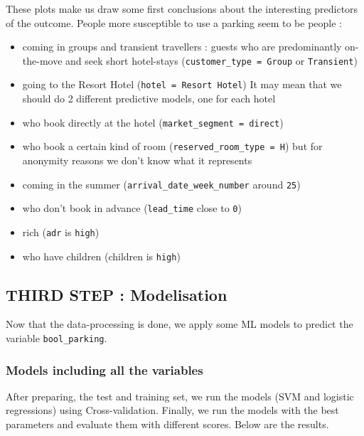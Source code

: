 \documentclass[10pt,a4paper]{article}
\providecommand{\tightlist}{%
  \setlength{\parskip}{0pt}
  }
\theoremstyle{break}
\begin{document}
\newline

These plots make us draw some first conclusions about the interesting predictors of the outcome. People more susceptible to use a parking seem to be people :

\begin{itemize}
\tightlist
\item
  coming in groups and transient travellers : guests who are predominantly on-the-move and seek short hotel-stays (\texttt{customer\_type\ =\ Group} or \texttt{Transient})
\item
  going to the Resort Hotel (\texttt{hotel\ =\ Resort\ Hotel}) \faArrowCircleRight{} It may mean that we should do 2 different predictive models, one for each hotel
\item
  who book directly at the hotel (\texttt{market\_segment\ =\ direct})
\item
  who book a certain kind of room (\texttt{reserved\_room\_type\ =\ H}) but for anonymity reasons we don't know what it represents
\item
  coming in the summer (\texttt{arrival\_date\_week\_number} around \texttt{25})
\item
  who don't book in advance (\texttt{lead\_time} close to \texttt{0})
\item
  rich (\texttt{adr} is \texttt{high})
\item
  who have children (children is \texttt{high})
\end{itemize}

\hypertarget{third-step-modelisation}{%
\subsection{THIRD STEP : Modelisation}\label{third-step-modelisation}}

Now that the data-processing is done, we apply some ML models to predict the variable \texttt{bool\_parking}.

\hypertarget{models-including-all-the-variables}{%
\subsubsection{Models including all the variables}\label{models-including-all-the-variables}}

After preparing, the test and training set, we run the models (SVM and logistic regressions) using Cross-validation. Finally, we run the models with the best parameters and evaluate them with different scores. Below are the results.
\end{document}
